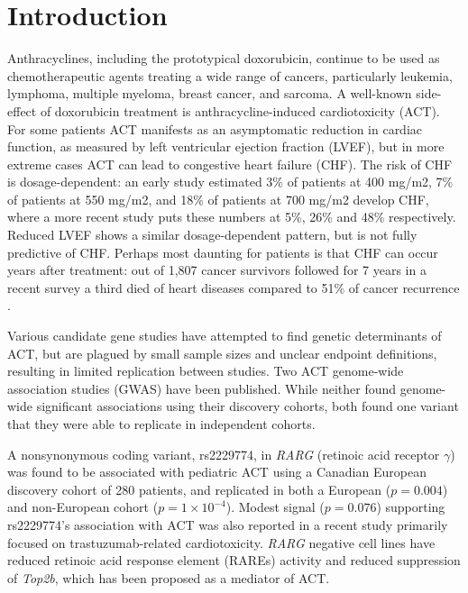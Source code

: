\documentclass{article}
\begin{document}
\section*{Introduction}

Anthracyclines, including the prototypical doxorubicin, continue to be used as chemotherapeutic agents treating a wide range of cancers, particularly leukemia, lymphoma, multiple myeloma, breast cancer, and sarcoma. 
A well-known side-effect of doxorubicin treatment is anthracycline-induced cardiotoxicity (ACT). 
For some patients ACT manifests as an asymptomatic reduction in cardiac function, as measured by left ventricular ejection fraction (LVEF), but in more extreme cases ACT can lead to congestive heart failure (CHF). 
The risk of CHF is dosage-dependent: an early study\cite{von1979risk} estimated 3\% of patients at 400 mg/m2, 7\% of patients at 550 mg/m2, and 18\% of patients at 700 mg/m2 develop CHF, where a more recent study puts these numbers at 5\%, 26\% and 48\% respectively\cite{Swain2003}. 
Reduced LVEF shows a similar dosage-dependent pattern, but is not fully predictive of CHF. 
Perhaps most daunting for patients is that CHF can occur years after treatment: out of 1,807 cancer survivors followed for 7 years in a recent survey a third died of heart diseases compared to 51\% of cancer recurrence \cite{vejpongsa2014prevention}. 


Various candidate gene studies have attempted to find genetic determinants of ACT, but are plagued by small sample sizes and unclear endpoint definitions, resulting in limited replication between studies. 
Two ACT genome-wide association studies (GWAS) have been published\cite{Aminkeng2015,Schneider2016}. 
While neither found genome-wide significant associations using their discovery cohorts, both found one variant that they were able to replicate in independent cohorts. 

A nonsynonymous coding variant, rs2229774, in \emph{RARG} (retinoic acid receptor $\gamma$) was found to be associated with pediatric ACT using a Canadian European discovery cohort of 280 patients\cite{Aminkeng2015}, and replicated in both a European ($p=0.004$) and non-European cohort ($p=1 \times 10^{-4}$). 
Modest signal ($p=0.076$) supporting rs2229774's association with ACT was also reported in a recent study primarily focused on trastuzumab-related cardiotoxicity\cite{Serie2017}.
\emph{RARG} negative cell lines have reduced retinoic acid response element (RAREs) activity and reduced suppression of \emph{Top2b}\cite{Aminkeng2015}, which has been proposed as a mediator of ACT. 
 
\end{document}
